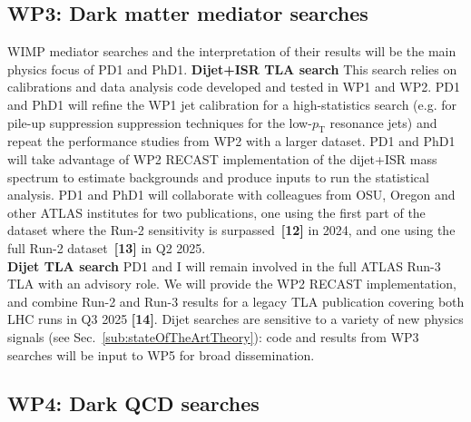 \subsection{WP3: Dark matter mediator searches}

WIMP mediator searches and the interpretation of their results will be the main physics focus of PD1 and PhD1.
\textbf{Dijet+ISR TLA search} This search relies on calibrations and data analysis code developed and tested in WP1 and WP2.
PD1 and PhD1 will refine the WP1 jet calibration for a high-statistics search (e.g. for pile-up suppression suppression techniques for the low-$p_{\mathrm{T}}$ resonance jets) and repeat the performance studies from WP2 with a larger dataset. 
PD1 and PhD1 will take advantage of WP2 RECAST implementation of the dijet+ISR mass spectrum to estimate backgrounds and produce inputs to run the statistical analysis.
PD1 and PhD1 will collaborate with colleagues from OSU, Oregon and other ATLAS institutes for two publications, one using the first part of the dataset where the Run-2 sensitivity is surpassed~\textbf{[12]} in 2024, and one using the full Run-2 dataset~\textbf{[13]} in Q2 2025.\\ 
\textbf{Dijet TLA search} PD1 and I will remain involved in the full ATLAS Run-3 TLA with an advisory role. 
We will provide the WP2 RECAST implementation, and combine Run-2 and Run-3 results for a legacy TLA publication covering both LHC runs in Q3 2025 \textbf{[14]}. 
Dijet searches are sensitive to a variety of new physics signals (see Sec.~\ref{sub:stateOfTheArtTheory}): code and results from WP3 searches will be input to WP5 for broad dissemination. 

\subsection{WP4: Dark QCD searches}

